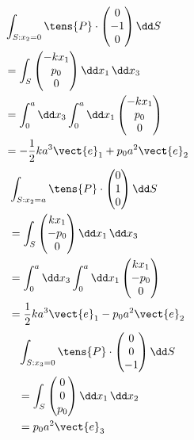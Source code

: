 \begin{align*}
&\int_{S:x_{2}=0}\tens{P}\cdot\begin{pmatrix}0\\-1\\0\end{pmatrix}\dd S\\
&=\int_{S}\begin{pmatrix}-kx_{1}\\p_{0}\\0\end{pmatrix}\dd x_{1}\,\dd x_{3}\\
&=\int_{0}^{a}\dd x_{3}\int_{0}^{a}\dd x_{1}\begin{pmatrix}-kx_{1}\\p_{0}\\0\end{pmatrix}\\
&=-\frac{1}{2}ka^{3}\vect{e}_{1}+p_{0}a^{2}\vect{e}_{2}
\end{align*}
\begin{align*}
&\int_{S:x_{2}=a}\tens{P}\cdot\begin{pmatrix}0\\1\\0\end{pmatrix}\dd S\\
&=\int_{S}\begin{pmatrix}kx_{1}\\-p_{0}\\0\end{pmatrix}\dd x_{1}\,\dd x_{3}\\
&=\int_{0}^{a}\dd x_{3}\int_{0}^{a}\dd x_{1}\begin{pmatrix}kx_{1}\\-p_{0}\\0\end{pmatrix}\\
&=\frac{1}{2}ka^{3}\vect{e}_{1}-p_{0}a^{2}\vect{e}_{2}
\end{align*}
\begin{align*}
&\int_{S:x_{3}=0}\tens{P}\cdot\begin{pmatrix}0\\0\\-1\end{pmatrix}\dd S\\
&=\int_{S}\begin{pmatrix}0\\0\\p_{0}\end{pmatrix}\dd x_{1}\,\dd x_{2}\\
&=p_{0}a^{2}\vect{e}_{3}
\end{align*}
